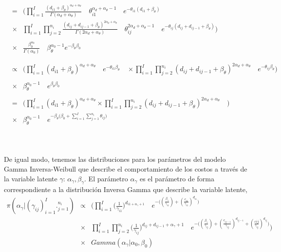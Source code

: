 \\
\begin{eqnarray*}
&=&\Bigg(\prod_{i=1}^I \frac{(d_{i1}+\beta_\theta)^{\alpha_d+\alpha_\theta}}{\Gamma(\alpha_d+\alpha_\theta)} \quad \theta_{i1}^{\alpha_d+\alpha_\theta-1} \quad e^{-\theta_{i1}(d_{i1}+\beta_\theta)} \\
&\times& \prod_{i=1}^I \prod_{j=2}^{n_i} \frac{(d_{ij}+d_{ij-1}+\beta_\theta)^{2\alpha_d+\alpha_\theta}}{\Gamma(2\alpha_d+\alpha_\theta)} \quad \theta_{ij}^{2\alpha_d+\alpha_\theta-1} \quad e^{-\theta_{ij}(d_{ij}+d_{ij-1}+\beta_\theta)}\Bigg) \\
\\
&\times & \frac{\beta_0^{\alpha_0}}{\Gamma(\alpha_0)} \quad \beta_\theta^{\alpha_0-1} e^{-\beta_\theta\beta_0}\\
\\
\\
&\propto& \Bigg(\prod_{i=1}^I (d_{i1}+\beta_\theta)^{\alpha_d+\alpha_\theta} \quad e^{-\theta_{i1}\beta_\theta} \quad \times \prod_{i=1}^I \prod_{j=2}^{n_i} (d_{ij}+d_{ij-1}+\beta_\theta)^{2\alpha_d+\alpha_\theta} \quad e^{-\theta_{ij}\beta_\theta} \Bigg) \\
\\
&\times& \beta_\theta^{\alpha_0-1} \quad e^{\beta_\theta \beta_0}\\
\\
&=& \Bigg(\prod_{i=1}^I (d_{i1}+\beta_\theta)^{\alpha_d+\alpha_\theta}\times \prod_{i=1}^I \prod_{j=2}^{n_i} (d_{ij}+d_{ij-1}+\beta_\theta)^{2\alpha_d+\alpha_\theta}\quad \Bigg)\\
&\times& \beta_\theta^{\alpha_0-1} \quad e^{-\beta_\theta\big(\beta_0+\sum_{i=1}^I \sum_{j=1}^{n_i}\theta_{ij}\big)}
\end{eqnarray*}
\\
\\
\\
De igual modo, tenemos las distribuciones para los par\'ametros del modelo Gamma Inversa-Weibull que describe el comportamiento de los costos a trav\'es de la variable latente $\gamma$: $\alpha_\gamma, \beta_\gamma$. El par\'ametro $\alpha_\gamma$ es el par\'ametro de forma correspondiente a la distribuci\'on Inversa Gamma que describe la variable latente,\\
\begin{eqnarray*}
\pi(\alpha_\gamma|(\gamma_{ij})_{i=1}^I._{j=1}^{n_i}) &\propto& \Bigg(\prod_{i=1}^I \bigg(\frac{1}{\gamma_{i1}}\bigg)^{d_{i1+\alpha_\gamma+1}}\quad e^{-\big((\frac{\beta_\gamma}{\gamma_{i1}})+(\frac{c_{i1}}{\gamma_{i1}})^{d_{i1}}\big)}\\
&\times& \prod_{i=1}^I \prod_{j=2}^{n_i} \bigg(\frac{1}{\gamma_{ij}}\bigg)^{d_{ij}+d_{ij-1}+\alpha_\gamma+1}\quad e^{-\big((\frac{\beta_\gamma}{\gamma_{ij}})+(\frac{c_{ij-1}}{\gamma_{ij}})^{d_{ij-1}}+(\frac{c_{}ij}{\gamma_{ij}})^{d_{ij}}\big)}\Bigg)\\
&\times& Gamma(\alpha_\gamma|\alpha_0,\beta_0)
\end{eqnarray*}
